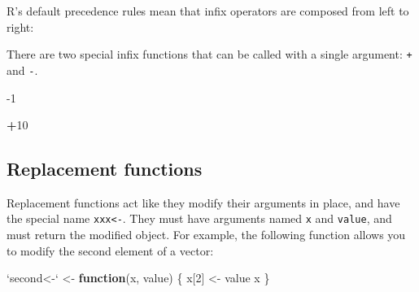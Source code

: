 \documentclass[]{book}
\newenvironment{Shaded}{\begin{snugshade}}{\end{snugshade}}
\newcommand{\ControlFlowTok}[1]{\textcolor[rgb]{0.13,0.29,0.53}{\textbf{#1}}}
\newcommand{\DataTypeTok}[1]{\textcolor[rgb]{0.13,0.29,0.53}{#1}}
\newcommand{\DecValTok}[1]{\textcolor[rgb]{0.00,0.00,0.81}{#1}}
\newcommand{\KeywordTok}[1]{\textcolor[rgb]{0.13,0.29,0.53}{\textbf{#1}}}
\newcommand{\NormalTok}[1]{#1}
\newcommand{\OperatorTok}[1]{\textcolor[rgb]{0.81,0.36,0.00}{\textbf{#1}}}
\newcommand{\StringTok}[1]{\textcolor[rgb]{0.31,0.60,0.02}{#1}}
\theoremstyle{definition}
\theoremstyle{definition}
\theoremstyle{definition}
\theoremstyle{remark}
\begin{document}
\begin{Shaded}
\end{Shaded}

R's default precedence rules mean that infix operators are composed from
left to right:

\begin{Shaded}
\end{Shaded}

There are two special infix functions that can be called with a single
argument: \texttt{+} and \texttt{-}.

\begin{Shaded}
\begin{Highlighting}[]
\DecValTok{-1}
\end{Highlighting}
\end{Shaded}

\begin{Shaded}
\begin{Highlighting}[]
\OperatorTok{+}\DecValTok{10}
\end{Highlighting}
\end{Shaded}

\hypertarget{replacement-functions}{%
\subsection{Replacement functions}\label{replacement-functions}}

Replacement functions act like they modify their arguments in place, and
have the special name \texttt{xxx\textless{}-}. They must have arguments
named \texttt{x} and \texttt{value}, and must return the modified
object. For example, the following function allows you to modify the
second element of a vector:

\begin{Shaded}
\begin{Highlighting}[]
\StringTok{`}\DataTypeTok{second<-}\StringTok{`}\NormalTok{ <-}\StringTok{ }\ControlFlowTok{function}\NormalTok{(x, value) \{}
\NormalTok{  x[}\DecValTok{2}\NormalTok{] <-}\StringTok{ }\NormalTok{value}
\NormalTok{  x}
\NormalTok{\}}
\end{Highlighting}
\end{Shaded}
\end{document}
